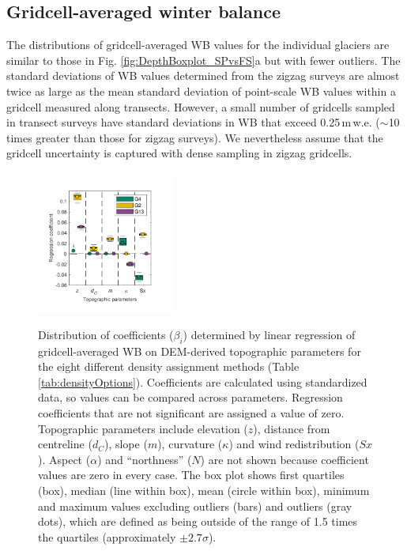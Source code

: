 \documentclass[review,oneside, letterpaper]{igs} %
\begin{document}
\subsection{Gridcell-averaged winter balance}

The distributions of gridcell-averaged WB values for the individual glaciers are similar to those in Fig. \ref{fig:DepthBoxplot_SPvsFS}a but with fewer outliers. The standard deviations of WB values determined from the zigzag surveys are almost twice as large as the mean standard deviation of point-scale WB values within a gridcell measured along transects. However, a small number of gridcells sampled in transect surveys have standard deviations in WB that exceed 0.25\,m\,w.e. ($\sim$10 times greater than those for zigzag surveys). We nevertheless assume that the gridcell uncertainty is captured with dense sampling in zigzag gridcells. 

\begin{figure}
	\centering
	\includegraphics[width =0.4\textwidth]{BetaCoeffs.pdf}\\
	\caption{Distribution of coefficients ($\beta_i$) determined by linear regression of gridcell-averaged WB on DEM-derived topographic parameters for the eight different density assignment methods (Table \ref{tab:densityOptions}). Coefficients are calculated using standardized data, so values can be compared across parameters. Regression coefficients that are not significant are assigned a value of zero. Topographic parameters include elevation ($z$), distance from centreline ($d_C$), slope ($m$), curvature ($\kappa$) and wind redistribution ($Sx$).  Aspect ($\alpha$) and ``northness'' ($N$) are not shown because coefficient values are zero in every case. The box plot shows first quartiles (box), median (line within box), mean (circle within box), minimum and maximum values excluding outliers (bars) and outliers (gray dots), which are defined as being outside of the range of 1.5 times the quartiles (approximately $\pm2.7\sigma$). }
	\label{fig:BetaCoeffs}
\end{figure}
\end{document}
